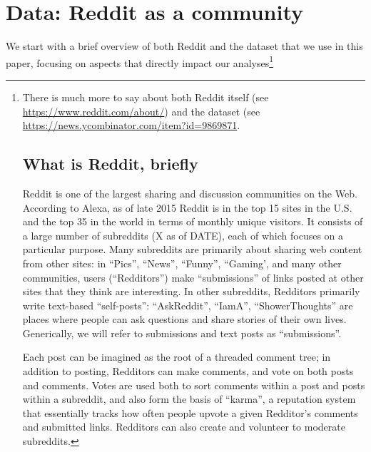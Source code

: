\section{Data: Reddit as a community}

We start with a brief overview of both Reddit and the dataset that we use in this paper, focusing on aspects that directly impact our analyses\footnote{There is much more to say about both Reddit itself (see \url{https://www.reddit.com/about/}) and the dataset (see 
\url{https://news.ycombinator.com/item?id=9869871}.

\subsection{What is Reddit, briefly}

Reddit is one of the largest sharing and discussion communities on the Web.  According to Alexa, as of late 2015 Reddit is in the top 15 sites in the U.S. and the top 35 in the world in terms of monthly unique visitors.  It consists of a large number of subreddits (X as of DATE), each of which focuses on a particular purpose.  Many subreddits are primarily about sharing web content from other sites: in ``Pics'', ``News'', ``Funny'', ``Gaming', and many other communities, users (``Redditors'') make ``submissions'' of links posted at other sites that they think are interesting.  In other subreddits, Redditors primarily write text-based ``self-posts'': ``AskReddit'', ``IamA'', ``ShowerThoughts'' are places where people can ask questions and share stories of their own lives.  Generically, we will refer to submissions and text posts as ``submissions''.  



Each post can be imagined as the root of a threaded comment tree; in addition to posting, Redditors can make comments, and vote on both posts and comments.  Votes are used both to sort comments within a post and posts within a subreddit, and also form the basis of ``karma'', a reputation system that essentially tracks how often people upvote a given Redditor's comments and submitted links.  Redditors can also create and volunteer to moderate subreddits.

}
